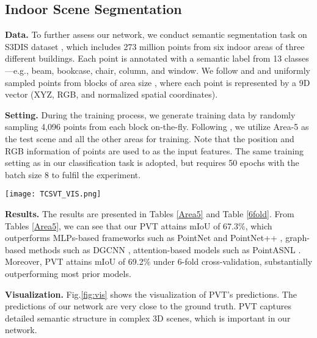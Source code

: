 \documentclass[10pt,twocolumn,letterpaper]{article}
\begin{document}
\subsection{Indoor Scene Segmentation}
\textbf{Data.} To further assess our network, we conduct semantic segmentation task on S3DIS dataset \cite{DBLP:journals/corr/ArmeniSZS17}, which includes 273 million points from six indoor areas of three different buildings. Each point is annotated with a semantic label from 13 classes—e.g., beam, bookcase, chair, column, and window. We follow \cite{2017SEGCloud} and \cite{qi2017pointnet} and uniformly sampled points from blocks of area size , where each point is represented by a 9D vector (XYZ, RGB, and normalized spatial coordinates).

\textbf{Setting. }
During the training process, we generate training data by randomly sampling
4,096 points from each block on-the-fly. Following \cite{2018Dynamic}, we utilize Area-5
as the test scene and all the other areas for training. Note that the position and RGB information of points are used to as the input features. The same training setting as in our classification task is adopted, but requires 50 epochs with the batch size 8 to fulfil the experiment.
\begin{figure*}
    \centering
    \texttt{[image: TCSVT\_VIS.png]}
    \caption{Visualization of semantic segmentation results on the S3DIS dataset. The input is in the top row, PVT predictions on the middle, the ground truth on the bottom.}
    \label{fig:vis}
\end{figure*}

\textbf{Results.} The results are presented in Tables \ref{Area5} and Table \ref{6fold}. From Tables \ref{Area5}, we can see that our PVT attains mIoU of 67.3\%, which outperforms MLPs-based frameworks such as PointNet \cite{qi2017pointnet} and PointNet++ \cite{qi2017pointnet++}, graph-based methods such as DGCNN \cite{2018Dynamic}, attention-based models such as PointASNL \cite{2020PointASNL}. Moreover, PVT attains mIoU of 69.2\% under 6-fold cross-validation, substantially outperforming most prior models.

\textbf{Visualization.} Fig.\ref{fig:vis} shows the visualization of PVT’s predictions. The predictions of our network are very close to the ground truth. PVT captures detailed semantic structure in complex 3D scenes, which is important in our network.
\end{document}
